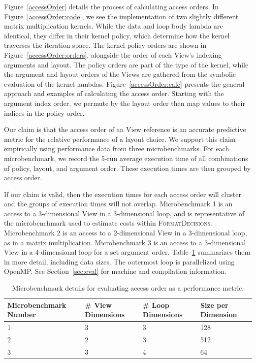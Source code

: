\documentclass[sigconf,review=true]{acmart}
\newcommand{\FormatDecisions}[0]{{\textsc{FormatDecisions}}}
\begin{document}
Figure~\ref{accessOrder} details the process of calculating access orders. 
In Figure~\ref{accessOrder:code}, we see the implementation of two slightly different matrix multiplication kernels. 
While the data and loop body lambda are identical, they differ in their kernel policy, which determine how the kernel traverses the iteration space.
The kernel policy orders are shown in Figure~\ref{accessOrder:orders}, alongside the order of each View's indexing arguments and layout.
The policy orders are part of the type of the kernel, while the argument and layout orders of the Views are gathered from the symbolic evaluation of the kernel lambdas.
Figure~\ref{accessOrder:calc} presents the general approach and examples of calculating the access order.
Starting with the argument index order, we permute by the layout order then map values to their indices in the policy order.

Our claim is that the access order of an View reference is an accurate predictive metric for the relative performance of a layout choice.
We support this claim empirically using performance data from three microbenchmarks.
For each microbenchmark, we record the 5-run average execution time of all combinations of policy, layout, and argument order. 
These execution times are then grouped by access order.

If our claim is valid, then the execution times for each access order will cluster and the groups of execution times will not overlap.
Microbenchmark 1 is an access to a 3-dimensional View in a 3-dimensional loop, and is representative of the microbenchmark used to estimate costs within \FormatDecisions. 
Microbenchmark 2 is an access to a 2-dimensional View in a 3-dimensional loop, as in a matrix multiplication.
Microbenchmark 3 is an access to a 3-dimensional View in a 4-dimensional loop for a set argument order.
Table~\ref{MicrobenchmarkDetails} summarizes them in more detail, including data sizes.
The outermost loop is parallelized using OpenMP.
See Section~\ref{sec:eval} for machine and compilation information.

\begin{table}
	\centering
	\begin{tabular}{|p{2.2cm}|p{1.6cm}|p{1.6cm}|p{1.5cm}|}
		\hline
		\raggedright Microbenchmark \linebreak Number & \raggedright \# View \linebreak Dimensions & \raggedright \# Loop \linebreak Dimensions & \raggedright Size per \linebreak Dimension \tabularnewline
		\hline
		1 & 3 & 3 & 128 \\
		2 & 2 & 3 & 512 \\
		3 & 3 & 4 & 64 \\
		\hline
	\end{tabular}
	\caption{Microbenchmark details for evaluating access order as a performance metric.}
	\label{MicrobenchmarkDetails}
\end{table}
\end{document}
